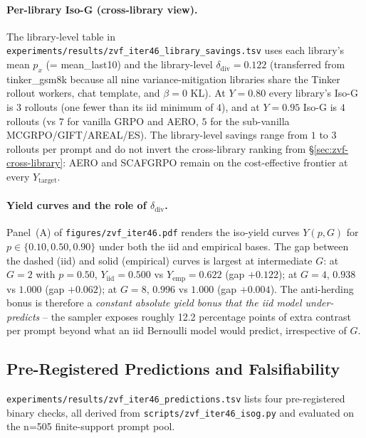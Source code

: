 \paragraph{Per-library Iso-G (cross-library view).}
The library-level table in
\texttt{experiments/results/zvf_iter46_library_savings.tsv} uses each
library's mean $p_x$ (= mean\_last10) and the library-level
$\delta_{\mathrm{div}}{=}0.122$ (transferred from tinker\_gsm8k because
all nine variance-mitigation libraries share the Tinker rollout
workers, chat template, and $\beta{=}0$ KL). At $Y{=}0.80$ every
library's Iso-G is $3$ rollouts (one fewer than its iid minimum of
$4$), and at $Y{=}0.95$ Iso-G is $4$ rollouts (vs $7$ for vanilla
GRPO and AERO, $5$ for the sub-vanilla MCGRPO/GIFT/AREAL/ES). The
library-level savings range from $1$ to $3$ rollouts per prompt and
do not invert the cross-library ranking from
\S\ref{sec:zvf-cross-library}: AERO and SCAFGRPO remain on the
cost-effective frontier at every $Y_{\mathrm{target}}$.

\paragraph{Yield curves and the role of $\delta_{\mathrm{div}}$.}
Panel~(A) of \texttt{figures/zvf_iter46.pdf} renders the iso-yield
curves $Y(p, G)$ for $p \in \{0.10, 0.50, 0.90\}$ under both
the iid and empirical bases. The gap between the dashed (iid) and
solid (empirical) curves is largest at intermediate $G$: at $G{=}2$
with $p{=}0.50$, $Y_{\mathrm{iid}}{=}0.500$ vs $Y_{\mathrm{emp}}{=}0.622$
(gap $+0.122$); at $G{=}4$, $0.938$ vs $1.000$ (gap $+0.062$);
at $G{=}8$, $0.996$ vs $1.000$ (gap $+0.004$). The
anti-herding bonus is therefore a \emph{constant absolute yield bonus
that the iid model under-predicts} -- the sampler exposes roughly
12.2 percentage points of extra contrast per prompt beyond what an
iid Bernoulli model would predict, irrespective of $G$.

\subsection{Pre-Registered Predictions and Falsifiability}
\label{sec:zvf-isog-predictions}
\texttt{experiments/results/zvf_iter46_predictions.tsv} lists four
pre-registered binary checks, all derived from
\texttt{scripts/zvf_iter46_isog.py} and evaluated on the
n=505 finite-support prompt pool.

